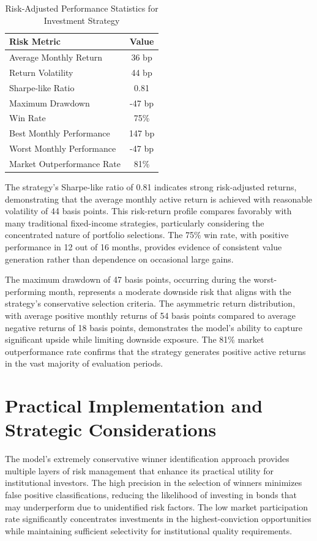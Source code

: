 \begin{table}[htbp]
\centering
\caption{Risk-Adjusted Performance Statistics for Investment Strategy}
\label{tab:risk_metrics}
\begin{tabular}{lc}
\hline
\textbf{Risk Metric} & \textbf{Value} \\
\hline
Average Monthly Return & 36 bp \\
Return Volatility & 44 bp \\
Sharpe-like Ratio & 0.81 \\
Maximum Drawdown & -47 bp \\
Win Rate & 75\% \\
Best Monthly Performance & 147 bp \\
Worst Monthly Performance & -47 bp \\
Market Outperformance Rate & 81\% \\
\hline
\end{tabular}
\end{table}

The strategy's Sharpe-like ratio of 0.81 indicates strong risk-adjusted returns, demonstrating that the average monthly active return is achieved with reasonable volatility of 44 basis points. This risk-return profile compares favorably with many traditional fixed-income strategies, particularly considering the concentrated nature of portfolio selections. The 75\% win rate, with positive performance in 12 out of 16 months, provides evidence of consistent value generation rather than dependence on occasional large gains.

The maximum drawdown of 47 basis points, occurring during the worst-performing month, represents a moderate downside risk that aligns with the strategy's conservative selection criteria. The asymmetric return distribution, with average positive monthly returns of 54 basis points compared to average negative returns of 18 basis points, demonstrates the model's ability to capture significant upside while limiting downside exposure. The 81\% market outperformance rate confirms that the strategy generates positive active returns in the vast majority of evaluation periods.

\section{Practical Implementation and Strategic Considerations}

The model's extremely conservative winner identification approach provides multiple layers of risk management that enhance its practical utility for institutional investors. The high precision in the selection of winners minimizes false positive classifications, reducing the likelihood of investing in bonds that may underperform due to unidentified risk factors. The low market participation rate significantly concentrates investments in the highest-conviction opportunities while maintaining sufficient selectivity for institutional quality requirements.

